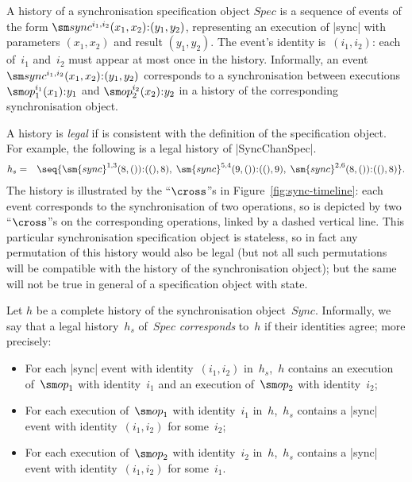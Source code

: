 A history of a synchronisation specification object $Spec$ is a sequence of
events of the form $\sync^{i_1, i_2}(x_1, x_2)\:: (y_1, y_2)$, representing an
execution of |sync| with parameters $(x_1, x_2)$ and result $(y_1,y_2)$.  The
event's  identity is~$(i_1,i_2)$: each of~$i_1$ and~$i_2$ must
appear at most once in the history.  Informally, an event $\sync^{i_1,
  i_2}(x_1, x_2)\:: (y_1, y_2)$ corresponds to a synchronisation between
executions $\op_1^{i_1}(x_1)\::y_1$ and $\op_2^{i_2}(x_2)\::y_2$ in a history
of the corresponding synchronisation object.

A history is \emph{legal} if is consistent with the definition of the
specification object.
%
For example, the following is a legal history of |SyncChanSpec|.
\begin{eqnarray*}
h_s & = & 
\seq{
 \sm{sync}^{1,3}(8,()) \:: ((), 8), \;
 \sm{sync}^{5,4}(9,()) \:: ((), 9), \;
 \sm{sync}^{2,6}(8,()) \:: ((), 8) } .
\end{eqnarray*}
The history is illustrated by the ``$\cross$''s in
Figure~\ref{fig:sync-timeline}: each event corresponds to the synchronisation
of two operations, so is depicted by two ``$\cross$''s on the corresponding
operations, linked by a dashed vertical line.  This particular synchronisation
specification object is stateless, so in fact any permutation of this history
would also be legal (but not all such permutations will be compatible with the
history of the synchronisation object); but the same will not be true in
general of a specification object with state.

Let $h$ be a complete history of the synchronisation object~$Sync$.
Informally, we say that a legal history~$h_s$ of~$Spec$ \emph{corresponds}
to~$h$ if their  identities agree; more precisely:
%
\begin{itemize}
\item For each |sync| event with identity~$(i_1,i_2)$ in~$h_s$,\, $h$ contains
  an execution of~$\op_1$ with identity~$i_1$ and an execution of~$\op_2$ with
  identity~$i_2$;

\item For each execution of~$\op_1$ with identity~$i_1$ in~$h$,\, $h_s$
  contains a |sync| event with identity~$(i_1,i_2)$ for some~$i_2$;

\item For each execution of~$\op_2$ with identity~$i_2$ in~$h$,\, $h_s$
  contains a |sync| event with identity~$(i_1,i_2)$ for some~$i_1$.
\end{itemize}



